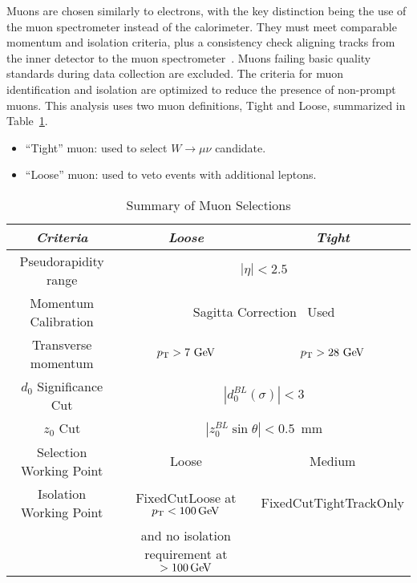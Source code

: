 \label{subsec:muon_selection}
Muons are chosen similarly to electrons, with the key distinction being the use of the muon spectrometer instead of the calorimeter. They must meet comparable momentum and isolation criteria, plus a consistency check aligning tracks from the inner detector to the muon spectrometer~\cite{Aad2023}. Muons failing basic quality standards during data collection are excluded.
The criteria for muon identification and isolation are optimized to reduce the presence of non-prompt muons.
This analysis uses two muon definitions, Tight and Loose, summarized in Table~\ref{tab:muon_selection}.
\begin{itemize}
\item ``Tight'' muon: used to select $W\to \mu\nu$ candidate.
\item ``Loose'' muon: used to veto events with additional leptons.
\end{itemize}

\begin{table}[ht]
\caption{Summary of Muon Selections}
\label{tab:muon_selection}
\begin{center}
\begin{tabular}[ht]{|c|c|c|}
\hline
  \emph{Criteria} & \emph{Loose} & \emph{Tight}\\
\hline
  Pseudorapidity range & \multicolumn{2}{c|}{$|\eta|<2.5$} \\
\hline
Momentum Calibration & \multicolumn{2}{c|}{Sagitta Correction~\cite{Aad2023} Used} \\
\hline
  Transverse momentum & $p_{\text{T}} > 7~\text{Ge\kern -0.1em V}$ & $p_{\text{T}} > 28~\text{Ge\kern -0.1em V}$ \\
\hline
  $d_0$ Significance Cut & \multicolumn{2}{c|}{$|d_{0}^{BL}(\sigma)|<3$} \\
\hline
  $z_0$ Cut & \multicolumn{2}{c|}{$|z_{0}^{BL} \sin\theta| < 0.5$~mm} \\
\hline
  Selection Working Point & Loose & Medium\\
\hline
  Isolation Working Point & FixedCutLoose at $p_{\text{T}}<100\,\text{Ge\kern -0.1em V}$                   & FixedCutTightTrackOnly \\
                          & and no isolation requirement at $>100\,\text{Ge\kern -0.1em V}$ & \\
\hline
\end{tabular}
\end{center}
\end{table}

